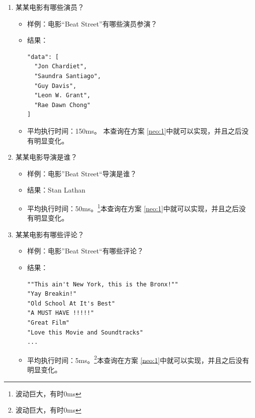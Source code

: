 \documentclass{ctexrep}
\begin{document}
\begin{enumerate}
\begin{itemize}
			\item 结果：4
			\item 平均执行时间：295ms。本查询在方案 \ref{neo:1}中就可以实现，并且之后没有明显变化。
		\end{itemize}
		\item 某某电影有哪些演员？\begin{itemize}
			\item 样例：电影“Beat Street”有哪些演员参演？
			\item 结果：\begin{lstlisting}
"data": [
  "Jon Chardiet",
  "Saundra Santiago",
  "Guy Davis",
  "Leon W. Grant",
  "Rae Dawn Chong"
]
			\end{lstlisting}
			\item 平均执行时间：150ms。 本查询在方案 \ref{neo:1}中就可以实现，并且之后没有明显变化。
		\end{itemize}
		\item 某某电影导演是谁？\begin{itemize}
			\item 样例：电影”Beat Street“导演是谁？
			\item 结果：Stan Lathan
			\item 平均执行时间：50ms。\footnote{波动巨大，有时0ms}本查询在方案 \ref{neo:1}中就可以实现，并且之后没有明显变化。
		\end{itemize}
		\item 某某电影有哪些评论？\begin{itemize}
			\item 样例：电影”Beat Street“有哪些评论？
			\item 结果：\begin{lstlisting}
""This ain't New York, this is the Bronx!""
"Yay Breakin!"
"Old School At It's Best"
"A MUST HAVE !!!!!"
"Great Film"
"Love this Movie and Soundtracks"
...
			\end{lstlisting}
			\item 平均执行时间：5ms。\footnote{波动巨大，有时0ms}本查询在方案 \ref{neo:1}中就可以实现，并且之后没有明显变化。
		\end{itemize}
	\end{enumerate}
\end{document}
